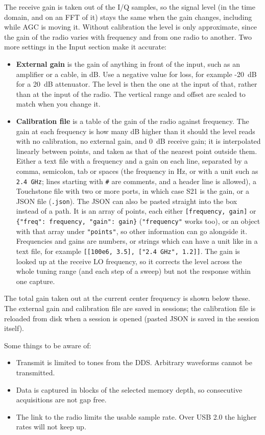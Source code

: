 The receive gain is taken out of the I/Q samples, so the signal level (in the time domain, and on an FFT of it) stays
the same when the gain changes, including while AGC is moving it. Without calibration the level is only approximate,
since the gain of the radio varies with frequency and from one radio to another. Two more settings in the Input
section make it accurate:
\begin{itemize}
\item \textbf{External gain} is the gain of anything in front of the input, such as an amplifier or a cable, in dB.
Use a negative value for loss, for example -20~dB for a 20~dB attenuator. The level is then the one at the input of
that, rather than at the input of the radio. The vertical range and offset are scaled to match when you change it.
\item \textbf{Calibration file} is a table of the gain of the radio against frequency. The gain at each frequency is
how many dB higher than it should the level reads with no calibration, no external gain, and 0~dB receive gain; it is
interpolated linearly between points, and taken as that of the nearest point outside them. Either a text file with a
frequency and a gain on each line, separated by a comma, semicolon, tab or spaces (the frequency in Hz, or with a
unit such as \texttt{2.4 GHz}; lines starting with \texttt{\#} are comments, and a header line is allowed), a
Touchstone file with two or more ports, in which case S21 is the gain, or a JSON file (\texttt{.json}). The JSON can
also be pasted straight into the box instead of a path. It is an array of points, each either
\texttt{[frequency, gain]} or \texttt{\{"freq": frequency, "gain": gain\}} (\texttt{"frequency"} works too), or
an object with that array under \texttt{"points"}, so other information can go alongside it. Frequencies and gains
are numbers, or strings which can have a unit like in a text file, for example
\texttt{[[100e6, 3.5], ["2.4 GHz", 1.2]]}. The gain is looked up at the receive LO frequency, so it corrects the
level across the whole tuning range (and each step of a sweep) but not the response within one capture.
\end{itemize}
The total gain taken out at the current center frequency is shown below these. The external gain and calibration file
are saved in sessions; the calibration file is reloaded from disk when a session is opened (pasted JSON is saved
in the session itself).

Some things to be aware of:
\begin{itemize}
\item Transmit is limited to tones from the DDS. Arbitrary waveforms cannot be transmitted.
\item Data is captured in blocks of the selected memory depth, so consecutive acquisitions are not gap free.
\item The link to the radio limits the usable sample rate. Over USB 2.0 the higher rates will not keep up.
\end{itemize}

